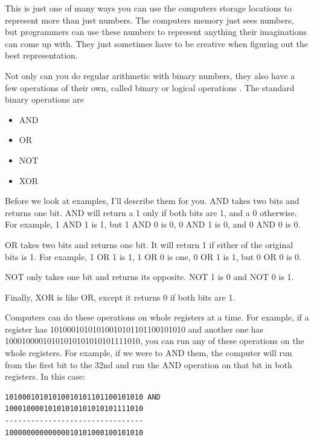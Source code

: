 This is just one of many ways you can use the computers storage locations
to represent more than just numbers.  The computers memory just sees numbers,
but programmers can use these numbers to represent anything their imaginations
can come up with.  They just sometimes have to be creative when figuring out
the best representation.

Not only can you do regular arithmetic with binary numbers, they also have
a few operations of their own, called binary
or logical operations
.  
The standard binary operations are

\begin{itemize}\item AND 
\item OR 
\item NOT 
\item XOR 
\end{itemize}

Before we look at examples, I'll describe them for you.
AND takes two bits and returns one bit.  AND will return a 1 only if
both bits are 1, and a 0 otherwise.  For example, 1 AND 1 is 1, but
1 AND 0 is 0, 0 AND 1 is 0, and 0 AND 0 is 0.  

OR takes two bits
and returns one bit.  It will return 1 if either of the original bits
is 1.  For example, 1 OR 1 is 1, 1 OR 0 is one, 0 OR 1 is 1, but 0 OR 0
is 0.

NOT only takes one bit and returns its opposite.  NOT 1 is 0 and
NOT 0 is 1.  

Finally, XOR is like OR, except it returns 0 if both bits
are 1.

Computers can do these operations on whole registers at a time.
For example, if a register has 10100010101010010101101100101010 and
another one has 10001000010101010101010101111010, you can run any of
these operations on the whole registers.  For example, if we were to
AND them, the computer will run from the first bit to the 32nd and run
the AND operation on that bit in both registers.  In this case:

\begin{simpletyping}
\begin{lstlisting}
10100010101010010101101100101010 AND
10001000010101010101010101111010
--------------------------------
10000000000000010101000100101010
\end{lstlisting}
\end{simpletyping}

